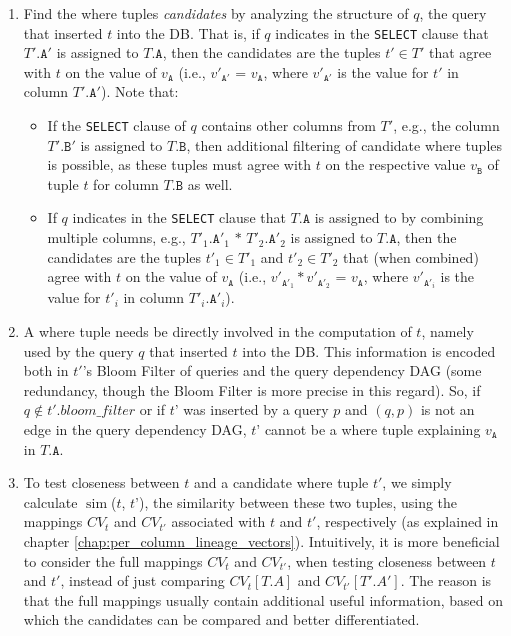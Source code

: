 \begin{enumerate}
    \item Find the where tuples \textit{candidates} by analyzing the structure of $q$, the query that inserted $t$ into the DB. That is, if $q$ indicates in the \texttt{SELECT} clause that $T'.\texttt{A}'$ is assigned to $T.\texttt{A}$, then the candidates are the tuples $t' \in T'$ that agree with $t$ on the value of $v_\texttt{A}$ (i.e., $v'_{\texttt{A}'}$ = $v_\texttt{A}$, where $v'_{\texttt{A}'}$ is the value for $t'$ in column $T'.\texttt{A}'$). 
    Note that: 
    \begin{itemize}
        \item If the \texttt{SELECT} clause of $q$ contains other columns from $T'$, e.g., the column $T'.\texttt{B}'$ is assigned to $T.\texttt{B}$, then additional filtering of candidate where tuples is possible, as these tuples must agree with $t$ on the respective value $v_\texttt{B}$ of tuple $t$ for column $T.\texttt{B}$ as well. 
        \item If $q$ indicates in the \texttt{SELECT} clause that $T.\texttt{A}$ is assigned to by combining multiple columns, e.g., $T'_1.\texttt{A}'_1$ $*$ $T'_2.\texttt{A}'_2$ is assigned to $T.\texttt{A}$, then the candidates are the tuples $t'_1 \in T'_1$ and $t'_2 \in T'_2$ that (when combined) agree with $t$ on the value of $v_\texttt{A}$ (i.e., $v'_{\texttt{A}'_1} * v'_{\texttt{A}'_2}$ = $v_\texttt{A}$, where $v'_{\texttt{A}'_i}$ is the value for $t'_i$ in column $T'_i.\texttt{A}'_i$). 
    \end{itemize}
    \item A where tuple needs be directly involved in the computation of $t$, namely used by the query $q$ that inserted $t$ into the DB.
    This information is encoded both in $t'$'s Bloom Filter of queries and the query dependency DAG (some redundancy, though the Bloom Filter is more precise in this regard).
    So, if $q \notin t'.bloom\_filter$ or if $t’$ was inserted by a query $p$ and $(q,p)$ is not an edge in the query dependency DAG, $t’$ cannot be a where tuple explaining $v_\texttt{A}$ in $T.\texttt{A}$.
    \item To test closeness between $t$ and a candidate where tuple $t'$, we simply calculate $\operatorname{sim}$($t$, $t’$), the similarity between these two tuples, using the mappings $CV_t$ and $CV_{t'}$ associated with $t$ and $t'$, respectively (as explained in chapter \ref{chap:per_column_lineage_vectors}). Intuitively, it is more beneficial to consider the full mappings $CV_t$ and $CV_{t'}$, when testing closeness between $t$ and $t'$, instead of just comparing $CV_t[T.A]$ and $CV_{t'}[T'.A']$. The reason is that the full mappings usually contain additional useful information, based on which the candidates can be compared and better differentiated.
\end{enumerate}
